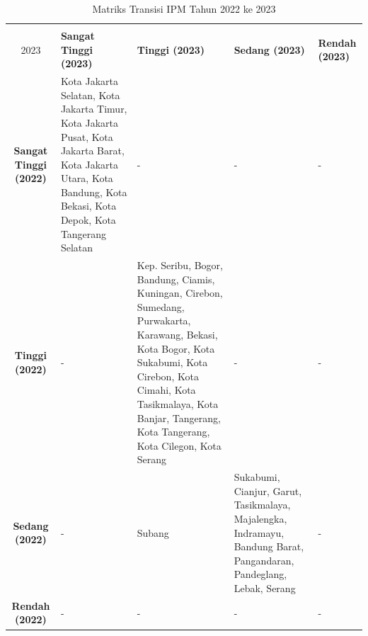 \begin{table}[H]
\centering
\caption{Matriks Transisi IPM Tahun 2022 ke 2023} \label{tab:ipm_transisi_2022_2023}
\begin{tabular}{|c|p{2cm}|p{2cm}|p{2cm}|p{2cm}|}
\hline
\textbf{Tahun 2022 \\ 2023} & \textbf{Sangat Tinggi (2023)} & \textbf{Tinggi (2023)} & \textbf{Sedang (2023)} & \textbf{Rendah (2023)} \\ \hline
\textbf{Sangat Tinggi (2022)} & Kota Jakarta Selatan, Kota Jakarta Timur, Kota Jakarta Pusat, Kota Jakarta Barat, Kota Jakarta Utara, Kota Bandung, Kota Bekasi, Kota Depok, Kota Tangerang Selatan & - & - & - \\ \hline
\textbf{Tinggi (2022)} & - & Kep. Seribu, Bogor, Bandung, Ciamis, Kuningan, Cirebon, Sumedang, Purwakarta, Karawang, Bekasi, Kota Bogor, Kota Sukabumi, Kota Cirebon, Kota Cimahi, Kota Tasikmalaya, Kota Banjar, Tangerang, Kota Tangerang, Kota Cilegon, Kota Serang & - & - \\ \hline
\textbf{Sedang (2022)} & - & Subang & Sukabumi, Cianjur, Garut, Tasikmalaya, Majalengka, Indramayu, Bandung Barat, Pangandaran, Pandeglang, Lebak, Serang & - \\ \hline
\textbf{Rendah (2022)} & - & - & - & - \\ \hline
\end{tabular}
\end{table}